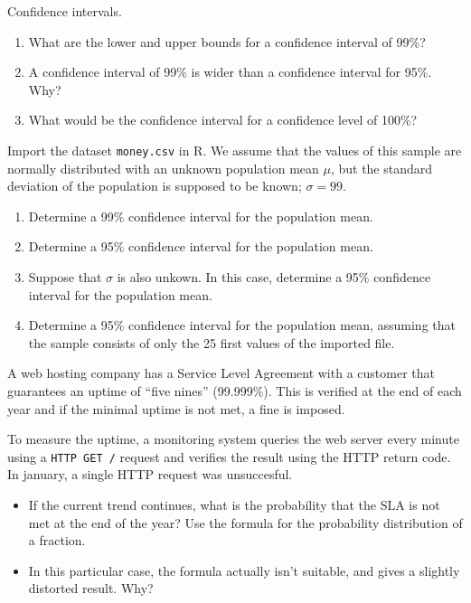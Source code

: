 \begin{exercise}
  Confidence intervals.
  
  \begin{enumerate}
    \item What are the lower and upper bounds for a confidence interval of 99\%?
    \item A confidence interval of 99\% is wider than a confidence interval for 95\%. Why?
    \item What would be the confidence interval for a confidence level of 100\%?
  \end{enumerate}
  
\end{exercise}

\begin{exercise}
  \label{ex:confidence-money}
  
  Import the dataset \texttt{money.csv} in R. 
  We assume that the values of this sample are normally distributed with 
  an unknown population mean $\mu$, but the standard deviation of the population
  is supposed to be known; $\sigma = 99$. 
  
  \begin{enumerate}
    \item Determine a 99\% confidence interval for the population mean.
    \item Determine a 95\% confidence interval for the population mean.
    \item Suppose that $\sigma$ is also unkown. In this case, determine a 95\% confidence interval for the population mean.
    \item Determine a 95\% confidence interval for the population mean, assuming that the sample consists of only the 25 first values of the imported file.
  \end{enumerate}
\end{exercise}

\begin{exercise}
  A web hosting company has a Service Level Agreement with a customer that guarantees an uptime of ``five nines'' (99.999\%). 
  This is verified at the end of each year and if the minimal uptime is not met, a fine is imposed.

  To measure the uptime, a monitoring system queries the web server every minute using a \texttt{HTTP GET /} request and verifies the result using the HTTP return code. 
  In january, a single HTTP request was unsuccesful.

  \begin{itemize}
    \item If the current trend continues, what is the probability that the SLA is not met at the end of the year? Use the formula for the probability distribution of a fraction.
    \item In this particular case, the formula actually isn't suitable, and gives a slightly distorted result. Why?
  \end{itemize}
\end{exercise}







